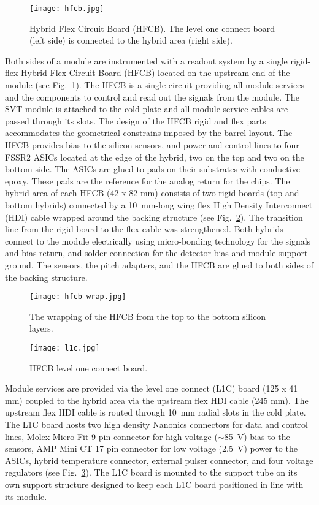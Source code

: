 \begin{figure}[hbt] 
\centering 
\texttt{[image: hfcb.jpg]}
\caption{Hybrid Flex Circuit Board (HFCB). The level one connect board (left side) is connected to the hybrid area (right side).}
\label{fig:HFCB}
\end{figure}

Both sides of a module are instrumented with a readout system by a single rigid-flex Hybrid Flex Circuit Board (HFCB) located on the upstream end of the module (see Fig.~\ref{fig:HFCB}). The HFCB is a single circuit providing all module services and the components to control and read out the signals from the module. The SVT module is attached to the cold plate and all module service cables are passed through its slots. The design of the HFCB rigid and flex parts accommodates the geometrical constrains imposed by the barrel layout. The HFCB provides bias to the silicon sensors, and power and control lines to four FSSR2 ASICs located at the edge of the hybrid, two on the top and two on the bottom side. The ASICs are glued to pads on their substrates with conductive epoxy. These pads are the reference for the analog return for the chips. The hybrid area of each HFCB (42 x 82 mm) consists of two rigid boards (top and bottom hybrids) connected by a 10~mm-long wing flex High Density Interconnect (HDI) cable wrapped around the backing structure (see Fig.~\ref{fig:hfcb-wrap}). The transition line from the rigid board to the flex cable was strengthened. Both hybrids connect to the module electrically using micro-bonding technology for the signals and bias return, and solder connection for the detector bias and module support ground. The sensors, the pitch adapters, and the HFCB are glued to both sides of the backing structure. 

\begin{figure}[hbt] 
\centering 
\texttt{[image: hfcb-wrap.jpg]}
\caption{The wrapping of the HFCB from the top to the bottom silicon layers.}
\label{fig:hfcb-wrap}
\end{figure}

\begin{figure}[hbt] 
\centering 
\texttt{[image: l1c.jpg]}
\caption{HFCB level one connect board.}
\label{fig:l1c}
\end{figure}

Module services are provided via the level one connect (L1C) board (125 x 41 mm) coupled to the hybrid area via the upstream flex HDI cable (245 mm). The upstream flex HDI cable is routed through 10~mm radial slots in the cold plate. The L1C board hosts two high density Nanonics connectors for data and control lines, Molex Micro-Fit 9-pin connector for high voltage ($\sim$85~V) bias to the sensors, AMP Mini CT 17 pin connector for low voltage (2.5~V) power to the ASICs, hybrid temperature connector, external pulser connector, and four voltage regulators (see Fig.~\ref{fig:l1c}). The L1C board is mounted to the support tube on its own support structure designed to keep each L1C board positioned in line with its module.

